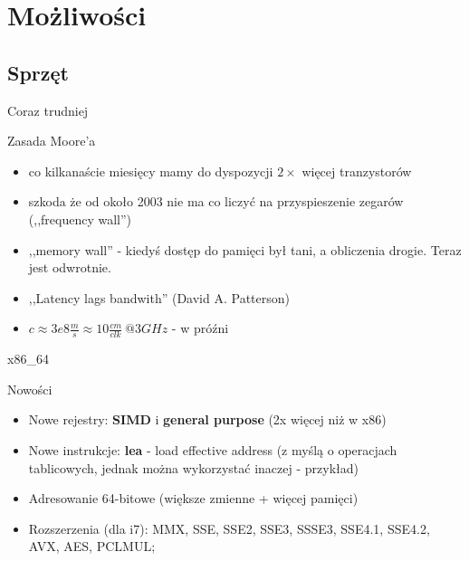 \section{Możliwości} %
\subsection{Sprzęt}
\begin{frame}{Coraz trudniej}
	\begin{block}{Zasada Moore'a}
		\begin{itemize}
			\item co kilkanaście miesięcy mamy do dyspozycji $2\times$ więcej tranzystorów
			\item szkoda że od około 2003 nie ma co liczyć na przyspieszenie zegarów (,,frequency wall'')
			\item ,,memory wall'' - kiedyś dostęp do pamięci był tani, a obliczenia drogie. Teraz jest odwrotnie.
			\item ,,Latency lags bandwith'' (David A. Patterson)
			\item $c \approx 3e8\frac{m}{s} \approx 10 \frac{cm}{clk}~@3GHz$ - w próźni
		\end{itemize}
	\end{block}
\end{frame}
\begin{frame}[fragile]{x86\_64}
	\begin{block}{Nowości}
		\begin{itemize}
			\item Nowe rejestry: \textbf{SIMD} i \textbf{general purpose} (2x więcej niż w x86)
			\item Nowe instrukcje: \textbf{lea} - load effective address (z myślą o operacjach
			tablicowych, jednak można wykorzystać inaczej - przykład)
			\item Adresowanie 64-bitowe (większe zmienne + więcej pamięci)
			\item Rozszerzenia (dla i7): MMX, SSE, SSE2, SSE3, SSSE3, SSE4.1, SSE4.2, AVX, AES, PCLMUL;
		\end{itemize}
	\end{block}
\end{frame}
